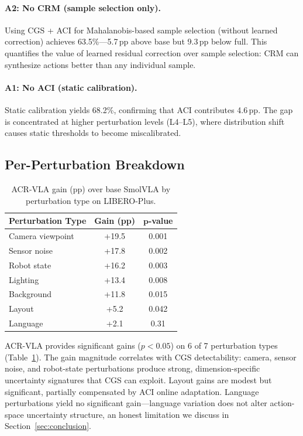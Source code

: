 \documentclass[letterpaper]{article}
\begin{document}
\paragraph{A2: No CRM (sample selection only).}
Using CGS + ACI for Mahalanobis-based sample selection (without learned correction) achieves 63.5\%---5.7\,pp above base but 9.3\,pp below full.
This quantifies the value of learned residual correction over sample selection: CRM can synthesize actions better than any individual sample.

\paragraph{A1: No ACI (static calibration).}
Static calibration yields 68.2\%, confirming that ACI contributes 4.6\,pp.
The gap is concentrated at higher perturbation levels (L4--L5), where distribution shift causes static thresholds to become miscalibrated.

\subsection{Per-Perturbation Breakdown}

\begin{table}[h]
\centering
\caption{ACR-VLA gain (pp) over base SmolVLA by perturbation type on LIBERO-Plus.}
\label{tab:perturbation}
\begin{tabular}{lcc}
\toprule
\textbf{Perturbation Type} & \textbf{Gain (pp)} & $\boldsymbol{p}$\textbf{-value} \\
\midrule
Camera viewpoint & +19.5 & 0.001 \\
Sensor noise & +17.8 & 0.002 \\
Robot state & +16.2 & 0.003 \\
Lighting & +13.4 & 0.008 \\
Background & +11.8 & 0.015 \\
Layout & +5.2 & 0.042 \\
Language & +2.1 & 0.31 \\
\bottomrule
\end{tabular}
\end{table}

ACR-VLA provides significant gains ($p{<}0.05$) on 6 of 7 perturbation types (Table~\ref{tab:perturbation}).
The gain magnitude correlates with CGS detectability: camera, sensor noise, and robot-state perturbations produce strong, dimension-specific uncertainty signatures that CGS can exploit.
Layout gains are modest but significant, partially compensated by ACI online adaptation.
Language perturbations yield no significant gain---language variation does not alter action-space uncertainty structure, an honest limitation we discuss in Section~\ref{sec:conclusion}.
\end{document}
